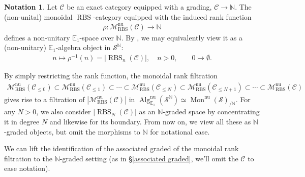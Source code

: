 \documentclass[12pt, reqno]{amsart}
\theoremstyle{plain}
\theoremstyle{definition}
\newtheorem{notation}[theorem]{Notation}
\newcommand{\N}{\mathbb N}
\begin{document}
\begin{notation}
Let $\mathcal{C}$ be an exact category equipped with a grading, $\mathcal{C}\rightarrow \N$. The (non-unital) monoidal $\operatorname{RBS}$-category equipped with the induced rank function
\begin{align*}
\rho\colon \mathscr{M}_{\operatorname{RBS}}^{\operatorname{nu}}(\mathcal{C})\rightarrow \N
\end{align*}
defines a non-unitary $\mathbb{E}_1$-space over $\N$. By , we may equivalently view it as a (non-unitary) $\mathbb{E}_1$-algebra object in $\mathcal{S}^\N$:
\begin{align*}
n\mapsto \rho^{-1}(n)=|\operatorname{RBS}_n(\mathcal{C})|,\quad n>0,\qquad 0\mapsto \emptyset.
\end{align*}

By simply restricting the rank function, the monoidal rank filtration
\begin{align*}
\mathscr{M}_{\operatorname{RBS}}^{\operatorname{nu}}(\mathcal{C}_{\leq 0})\subset \mathscr{M}_{\operatorname{RBS}}^{\operatorname{nu}}(\mathcal{C}_{\leq 1}) \subset\cdots \subset \mathscr{M}_{\operatorname{RBS}}^{\operatorname{nu}}(\mathcal{C}_{\leq N})\subset \mathscr{M}_{\operatorname{RBS}}^{\operatorname{nu}}(\mathcal{C}_{\leq N+1}) \subset \cdots
 \subset \mathscr{M}_{\operatorname{RBS}}^{\operatorname{nu}}(\mathcal{C})
\end{align*}
gives rise to a filtration of $|\mathscr{M}_{\operatorname{RBS}}^{\operatorname{nu}}(\mathcal{C})|$ in $\operatorname{Alg}_{\mathbb{E}_1}^{\operatorname{nu}}(\mathcal{S}^\N)\simeq \operatorname{Mon}^{\operatorname{nu}}(\mathcal{S})_{/\N}$. For any $N>0$, we also consider $|\operatorname{RBS}_N(\mathcal{C})|$ as an $\N$-graded space by concentrating it in degree $N$ and likewise for its boundary. From now on, we view all these as $\N$-graded objects, but omit the morphisms to $\N$ for notational ease.
\end{notation}

We can lift the identification of the associated graded of the monoidal rank filtration to the $\N$-graded setting (as in \S \ref{associated graded}, we'll omit the $\mathcal{C}$ to ease notation).
\end{document}
